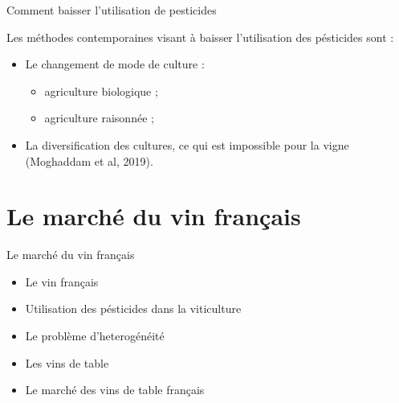 \documentclass[11pt,ignorenonframetext,]{beamer}
\providecommand{\tightlist}{%
  \setlength{\itemsep}{0pt}\setlength{\parskip}{0pt}}
\begin{document}
\begin{frame}{Comment baisser l'utilisation de pesticides}
\protect\hypertarget{comment-baisser-lutilisation-de-pesticides}{}

Les méthodes contemporaines visant à baisser l'utilisation des
pésticides sont :

\begin{itemize}
\tightlist
\item
  Le changement de mode de culture :

  \begin{itemize}
  \tightlist
  \item
    agriculture biologique ;
  \item
    agriculture raisonnée ;
  \end{itemize}
\item
  La diversification des cultures, ce qui est impossible pour la vigne
  (Moghaddam et al, 2019).
\end{itemize}

\end{frame}

\hypertarget{le-marche-du-vin-francais}{%
\section{Le marché du vin français}\label{le-marche-du-vin-francais}}

\begin{frame}{Le marché du vin français}
\protect\hypertarget{le-marche-du-vin-francais-1}{}

\begin{itemize}
\tightlist
\item
  Le vin français
\item
  Utilisation des pésticides dans la viticulture
\item
  Le problème d'heterogénéité
\item
  Les vins de table
\item
  Le marché des vins de table français
\end{itemize}

\end{frame}
\end{document}
